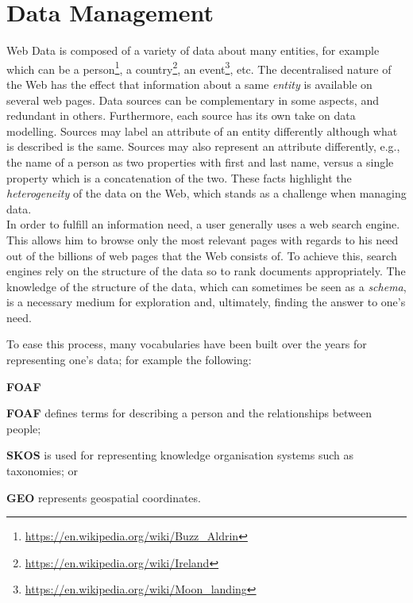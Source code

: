\section{Data Management}
\label{chap:introduction:data-mgmt}

Web Data is composed of a variety of data about many entities, for example which can be a person\footnote{\url{https://en.wikipedia.org/wiki/Buzz_Aldrin}}, a country\footnote{\url{https://en.wikipedia.org/wiki/Ireland}}, an event\footnote{\url{https://en.wikipedia.org/wiki/Moon_landing}}, etc.
The decentralised nature of the Web has the effect that information about a same \emph{entity} is available on several web pages. Data sources can be complementary in some aspects, and redundant in others. Furthermore, each source has its own take on data modelling. Sources may label an attribute of an entity differently although what is described is the same. Sources may also represent an attribute differently, e.g., the name of a person as two properties with first and last name, versus a single property which is a concatenation of the two. These facts highlight the \emph{heterogeneity} of the data on the Web, which stands as a challenge when managing data.\\

In order to fulfill an information need, a user generally uses a web search engine. This allows him to browse only the most relevant pages with regards to his need out of the billions of web pages that the Web consists of. To achieve this, search engines rely on the structure of the data so to rank documents appropriately. The knowledge of the structure of the data, which can sometimes be seen as a \emph{schema}, is a necessary medium for exploration and, ultimately, finding the answer to one's need.

To ease this process, many vocabularies have been built over the years for representing one's data; for example the following:
\begin{labeling}{\textbf{FOAF}}
	\item[\textbf{FOAF}\protect\footnotemark] defines terms for describing a person and the relationships between people;
	\item[\textbf{SKOS}\protect\footnotemark] is used for representing knowledge organisation systems such as taxonomies; or
	\item[\textbf{GEO}\protect\footnotemark] represents geospatial coordinates.
\end{labeling}

